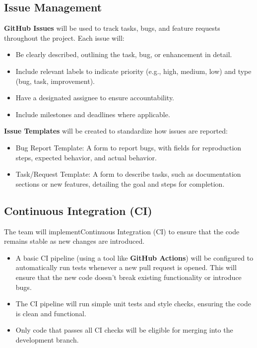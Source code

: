 \documentclass{article}
\begin{document}
\subsection{Issue Management}
\textbf{GitHub Issues} will be used to track tasks, bugs, and feature requests throughout the project. Each issue will:
\begin{itemize}
    \item Be clearly described, outlining the task, bug, or enhancement in detail.
    \item Include relevant labels to indicate priority (e.g., high, medium, low) and type (bug, task, improvement).
    \item Have a designated assignee to ensure accountability.
    \item Include milestones and deadlines where applicable.
\end{itemize}\par

\textbf{Issue Templates} will be created to standardize how issues are reported:
\begin{itemize}
    \item Bug Report Template: A form to report bugs, with fields for reproduction steps, expected behavior, and actual behavior.
    \item Task/Request Template: A form to describe tasks, such as documentation sections or new features, detailing the goal and steps for completion.
\end{itemize}

\subsection{Continuous Integration (CI)}
The team will implementContinuous Integration (CI) to ensure that the code remains stable as new changes are introduced.
\begin{itemize}
    \item A basic CI pipeline (using a tool like \textbf{GitHub Actions}) will be configured to automatically run tests whenever a new pull request is opened. This will ensure that the new code doesn’t break existing functionality or introduce bugs.
    \item The CI pipeline will run simple unit tests and style checks, ensuring the code is clean and functional.
    \item Only code that passes all CI checks will be eligible for merging into the development branch.
\end{itemize}
\end{document}
